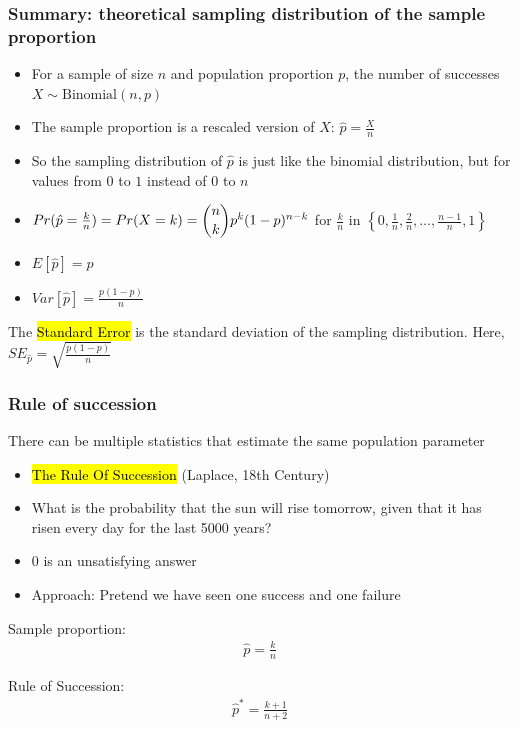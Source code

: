 \documentclass[t,compress,mathserif]{beamer}
\begin{document}
\begin{frame}
\frametitle{Summary: theoretical sampling distribution of the sample proportion}
\begin{itemize}
    \item For a sample of size $n$ and population proportion $p$, the number of successes $X \sim \text{Binomial}(n, p)$
    \item The sample proportion is a rescaled version of $X$: $\hat{p} = \frac{X}{n}$
    \pause
    \item So the sampling distribution of $\hat{p}$ is just like the binomial distribution, but for values from $0$ to $1$ instead of $0$ to $n$
    \pause
    \item $Pr(\hat{p} = \frac{k}{n}) = Pr(X = k) = \dbinom{n}{k} p^k (1-p)^{n-k}$ for $\frac{k}{n}$ in $\left\{0, \frac{1}{n}, \frac{2}{n}, \ldots, \frac{n-1}{n}, 1\right\}$
    \pause
    \item $E[\hat{p}] = p$
    \item $Var[\hat{p}] = \frac{p(1-p)}{n}$
\end{itemize}
The \hl{Standard Error} is the standard deviation of the sampling distribution. Here, $SE_{\hat{p}} = \sqrt{\frac{p(1-p)}{n}}$
\end{frame}

\begin{frame}
    \frametitle{Rule of succession}

    There can be multiple statistics that estimate the same population parameter
    \begin{itemize}

        \item \hl{The Rule Of Succession} (Laplace, 18th Century)
        \item What is the probability that the sun will rise tomorrow, given that it has risen every day for the last 5000 years?
        \item 0 is an unsatisfying answer
        \item Approach: Pretend we have seen one success and one failure
    
    \end{itemize}

    Sample proportion:
     \begin{align}
        \hat{p}=\frac{k}{n}
    \end{align}
 
    Rule of Succession:
    \begin{align}
        \hat{p}^*=\frac{k +1}{n+2}
    \end{align}
 
\end{frame}
\end{document}
